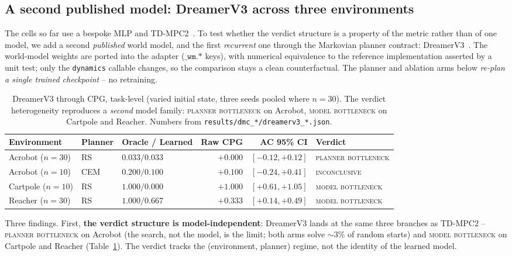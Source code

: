 \documentclass[10pt,letterpaper]{article}
\begin{document}
\subsection{A second published model: DreamerV3 across three environments}
\label{sec:dreamerv3}

The cells so far use a bespoke MLP and TD-MPC2~\citep{hansen2024tdmpc2}. To test whether the verdict structure is a property of the metric rather than of one model, we add a second \emph{published} world model, and the first \emph{recurrent} one through the Markovian planner contract: DreamerV3~\citep{hafner2023dreamerv3}. The world-model weights are ported into the adapter ($\texttt{\_wm.*}$ keys), with numerical equivalence to the reference implementation asserted by a unit test; only the \texttt{dynamics} callable changes, so the comparison stays a clean counterfactual. The planner and ablation arms below \emph{re-plan a single trained checkpoint} -- no retraining.

\begin{table}[t]
  \centering
  \small
  \begin{tabular}{lllrrl}
    \toprule
    Environment & Planner & Oracle / Learned & Raw CPG & AC 95\% CI & Verdict \\
    \midrule
    Acrobot ($n{=}30$)  & RS  & $0.033 / 0.033$ & $+0.000$ & $[-0.12, +0.12]$ & \textsc{planner bottleneck} \\
    Acrobot ($n{=}10$)  & CEM & $0.200 / 0.100$ & $+0.100$ & $[-0.24, +0.41]$ & \textsc{inconclusive} \\
    Cartpole ($n{=}10$) & RS  & $1.000 / 0.000$ & $+1.000$ & $[+0.61, +1.05]$ & \textsc{model bottleneck} \\
    Reacher ($n{=}30$)  & RS  & $1.000 / 0.667$ & $+0.333$ & $[+0.14, +0.49]$ & \textsc{model bottleneck} \\
    \bottomrule
  \end{tabular}
  \caption{DreamerV3 through CPG, task-level (varied initial state, three seeds pooled where $n{=}30$). The verdict heterogeneity reproduces a \emph{second} model family: \textsc{planner bottleneck} on Acrobot, \textsc{model bottleneck} on Cartpole and Reacher. Numbers from \texttt{results/dmc\_*/dreamerv3\_*.json}.}
  \label{tab:dreamerv3}
\end{table}

Three findings. First, \textbf{the verdict structure is model-independent}: DreamerV3 lands at the same three branches as TD-MPC2 -- \textsc{planner bottleneck} on Acrobot (the search, not the model, is the limit; both arms solve $\sim\!3\%$ of random starts) and \textsc{model bottleneck} on Cartpole and Reacher (Table~\ref{tab:dreamerv3}). The verdict tracks the (environment, planner) regime, not the identity of the learned model.
\end{document}
